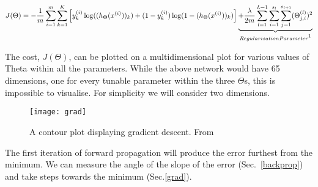 \begin{equation} \label{eq:cost}
  J(\Theta) = -\frac{1}{m}\sum_{i=1}^m\sum_{k=1}^K\left [y_k^{(i)}\log((h_\Theta(x^{(i)}))_k)+(1-y_k^{(i)})\log(1-(h_\Theta(x^{(i)}))_k)\right ]\underbrace{+\frac{\lambda}{2m}\sum_{l=1}^{L-1}\sum_{i=1}^{s_l}\sum_{j=1}^{s_{l+1}}(\Theta_{j,i}^{(l)})^2}_{Regularisation Parameter\footnote{The regularisation parameter is used to prevent overfitting the $\Theta$ values to the training data.  This is more of an implementation concern and not central to understanding ANNs. For more information, see~\cite{Nielsen2015}}}
\end{equation}

The cost, $J(\Theta)$, can be plotted on a multidimensional plot for various values of Theta within all the parameters. While the above network would have 65 dimensions, one for every tunable parameter within the three $\Theta$s, this is impossible to visualise. For simplicity we will consider two dimensions.

\begin{SCfigure}[1][h] \label{fig:grad}
  \texttt{[image: grad]}
  \caption{A contour plot displaying gradient descent. From~\cite{pict}}
\end{SCfigure}

The first iteration of forward propagation will produce the error furthest from the minimum. We can measure the angle of the slope of the error (Sec.~\ref{backprop}) and take steps towards the minimum (Sec.\ref{grad}).

